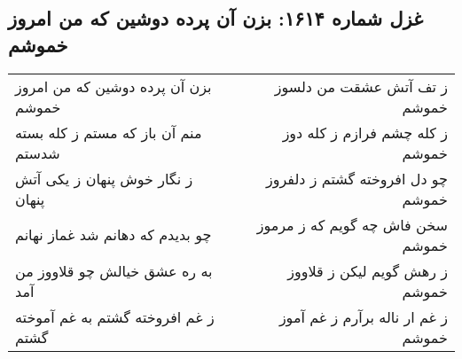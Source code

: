 \begin{center}
\section*{غزل شماره ۱۶۱۴: بزن آن پرده دوشین که من امروز خموشم}
\label{sec:1614}
\begin{longtable}{l p{0.5cm} r}
بزن آن پرده دوشین که من امروز خموشم
&&
ز تف آتش عشقت من دلسوز خموشم
\\
منم آن باز که مستم ز کله بسته شدستم
&&
ز کله چشم فرازم ز کله دوز خموشم
\\
ز نگار خوش پنهان ز یکی آتش پنهان
&&
چو دل افروخته گشتم ز دلفروز خموشم
\\
چو بدیدم که دهانم شد غماز نهانم
&&
سخن فاش چه گویم که ز مرموز خموشم
\\
به ره عشق خیالش چو قلاووز من آمد
&&
ز رهش گویم لیکن ز قلاووز خموشم
\\
ز غم افروخته گشتم به غم آموخته گشتم
&&
ز غم ار ناله برآرم ز غم آموز خموشم
\\
\end{longtable}
\end{center}
